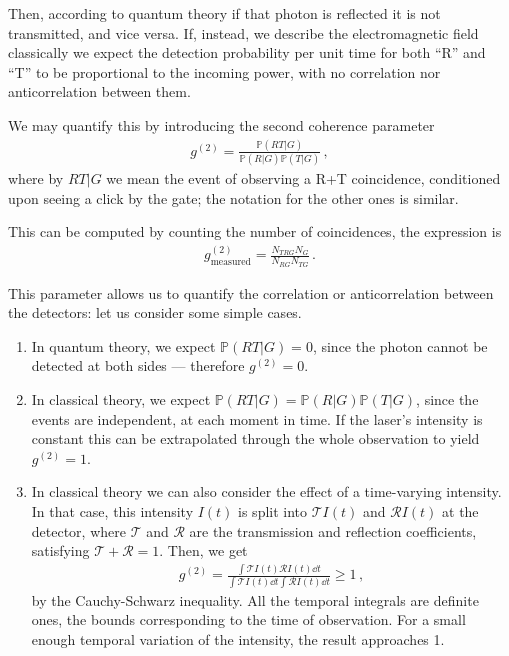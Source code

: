 \documentclass[main.tex]{subfiles}
\begin{document}
Then, according to quantum theory if that photon is reflected it is not transmitted, and vice versa. 
If, instead, we describe the electromagnetic field classically we expect the detection probability per unit time for both ``R'' and ``T'' to be proportional to the incoming power, with no correlation nor anticorrelation between them. 

We may quantify this by introducing the second coherence parameter 
%
\begin{align}
g^{(2)} = \frac{ \mathbb{P} (RT | G) }{\mathbb{P}(R|G) \mathbb{P}(T|G)}
\,,
\end{align}
%
where by \(RT | G\) we mean the event of observing a R+T coincidence, conditioned upon seeing a click by the gate; the notation for the other ones is similar. 

This can be computed by counting the number of coincidences, the expression is 
%
\begin{align}
g^{(2)}_{\text{measured}} = \frac{N_{TRG} N_G}{N_{RG} N_{TG}}
\,.
\end{align}

This parameter allows us to quantify the correlation or anticorrelation between the detectors: let us consider some simple cases. 

\begin{enumerate}
    \item In quantum theory, we expect \(\mathbb{P}(RT|G) = 0\), since the photon cannot be detected at both sides --- therefore \(g^{(2)} = 0\).
    \item In classical theory, we expect \(\mathbb{P}(RT|G) = \mathbb{P}(R|G) \mathbb{P}(T|G)\), since the events are independent, at each moment in time. If the laser's intensity is constant this can be extrapolated through the whole observation to yield \(g^{(2)} = 1\). 
    \item In classical theory we can also consider the effect of a time-varying intensity. In that case, this intensity \(I(t)\) is split into \(\mathcal{T}I(t)\) and \(\mathcal{R}I(t)\) at the detector, where \(\mathcal{T}\) and \(\mathcal{R}\) are the transmission and reflection coefficients, satisfying \(\mathcal{T} + \mathcal{R} =1\). Then, we get 
    \begin{align}
    g^{(2)} = \frac{ \int \mathcal{T} I(t) \mathcal{R}I(t) \dd{t}}{ \int \mathcal{T} I(t) \dd{t} \int \mathcal{R} I(t) \dd{t}} \geq 1
    \,,
    \end{align}
    by the Cauchy-Schwarz inequality. All the temporal integrals are definite ones, the bounds corresponding to the time of observation. For a small enough temporal variation of the intensity, the result approaches 1. 
\end{enumerate}
\end{document}
